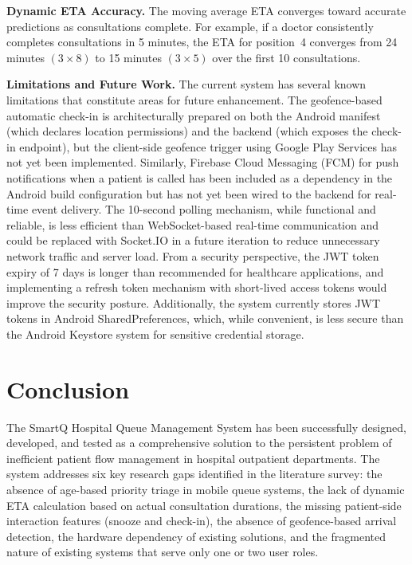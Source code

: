 \documentclass[12pt,a4paper]{article}
\begin{document}
\textbf{Dynamic ETA Accuracy.} The moving average ETA converges toward accurate predictions as consultations complete. For example, if a doctor consistently completes consultations in 5 minutes, the ETA for position~4 converges from 24 minutes $(3 \times 8)$ to 15 minutes $(3 \times 5)$ over the first 10 consultations.

\textbf{Limitations and Future Work.} The current system has several known limitations that constitute areas for future enhancement. The geofence-based automatic check-in is architecturally prepared on both the Android manifest (which declares location permissions) and the backend (which exposes the check-in endpoint), but the client-side geofence trigger using Google Play Services has not yet been implemented. Similarly, Firebase Cloud Messaging (FCM) for push notifications when a patient is called has been included as a dependency in the Android build configuration but has not yet been wired to the backend for real-time event delivery. The 10-second polling mechanism, while functional and reliable, is less efficient than WebSocket-based real-time communication and could be replaced with Socket.IO in a future iteration to reduce unnecessary network traffic and server load. From a security perspective, the JWT token expiry of 7 days is longer than recommended for healthcare applications, and implementing a refresh token mechanism with short-lived access tokens would improve the security posture. Additionally, the system currently stores JWT tokens in Android SharedPreferences, which, while convenient, is less secure than the Android Keystore system for sensitive credential storage.

\section{Conclusion}

The SmartQ Hospital Queue Management System has been successfully designed, developed, and tested as a comprehensive solution to the persistent problem of inefficient patient flow management in hospital outpatient departments. The system addresses six key research gaps identified in the literature survey: the absence of age-based priority triage in mobile queue systems, the lack of dynamic ETA calculation based on actual consultation durations, the missing patient-side interaction features (snooze and check-in), the absence of geofence-based arrival detection, the hardware dependency of existing solutions, and the fragmented nature of existing systems that serve only one or two user roles.
\end{document}
